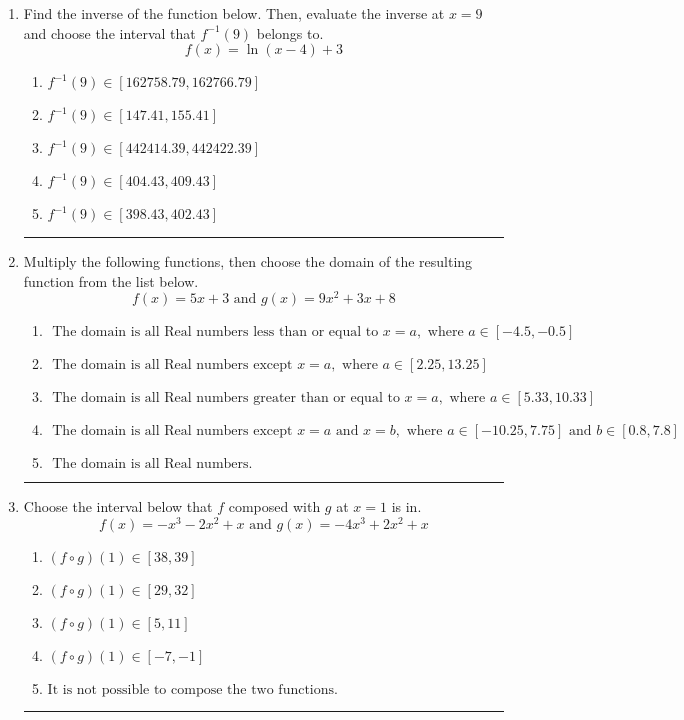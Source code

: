 \documentclass[14pt]{extbook}
\newcommand{\litem}[1]{\item#1\hspace*{-1cm}\rule{\textwidth}{0.4pt}}
\begin{document}
\begin{enumerate}
\litem{
Find the inverse of the function below. Then, evaluate the inverse at $x = 9$ and choose the interval that $f^{-1}(9)$ belongs to.\[ f(x) = \ln{(x-4)}+3 \]\begin{enumerate}[label=\Alph*.]
\item \( f^{-1}(9) \in [162758.79, 162766.79] \)
\item \( f^{-1}(9) \in [147.41, 155.41] \)
\item \( f^{-1}(9) \in [442414.39, 442422.39] \)
\item \( f^{-1}(9) \in [404.43, 409.43] \)
\item \( f^{-1}(9) \in [398.43, 402.43] \)

\end{enumerate} }
\litem{
Multiply the following functions, then choose the domain of the resulting function from the list below.\[ f(x) = 5x + 3 \text{ and } g(x) = 9x^{2} +3 x + 8 \]\begin{enumerate}[label=\Alph*.]
\item \( \text{ The domain is all Real numbers less than or equal to } x = a, \text{ where } a \in [-4.5, -0.5] \)
\item \( \text{ The domain is all Real numbers except } x = a, \text{ where } a \in [2.25, 13.25] \)
\item \( \text{ The domain is all Real numbers greater than or equal to } x = a, \text{ where } a \in [5.33, 10.33] \)
\item \( \text{ The domain is all Real numbers except } x = a \text{ and } x = b, \text{ where } a \in [-10.25, 7.75] \text{ and } b \in [0.8, 7.8] \)
\item \( \text{ The domain is all Real numbers. } \)

\end{enumerate} }
\litem{
Choose the interval below that $f$ composed with $g$ at $x=1$ is in.\[ f(x) = -x^{3} -2 x^{2} +x \text{ and } g(x) = -4x^{3} +2 x^{2} +x \]\begin{enumerate}[label=\Alph*.]
\item \( (f \circ g)(1) \in [38, 39] \)
\item \( (f \circ g)(1) \in [29, 32] \)
\item \( (f \circ g)(1) \in [5, 11] \)
\item \( (f \circ g)(1) \in [-7, -1] \)
\item \( \text{It is not possible to compose the two functions.} \)


\end{enumerate}}
\end{enumerate}
\end{document}
